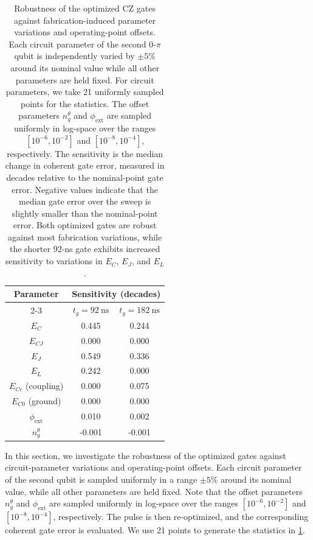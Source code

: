 \begin{table}[htbp]
\centering
\setlength{\tabcolsep}{11pt}
\renewcommand{\arraystretch}{1.1}
\small
\begin{tabular}{ccc}
\toprule
\multirow{2}{*}{Parameter}
& \multicolumn{2}{c}{Sensitivity (decades)} \\
\cmidrule(lr){2-3}
& $t_g = 92~\mathrm{ns}$ & $t_g = 182~\mathrm{ns}$ \\ \midrule
$E_{C}$                 & 0.445  & 0.244  \\
$E_{CJ}$                & 0.000  & 0.000 \\
$E_{J}$                 & 0.549  & 0.336  \\
$E_{L}$                 & 0.242  & 0.000  \\
$E_{Cc}$ (coupling)      & 0.000  & 0.075  \\
$E_{C0}$ (ground)        & 0.000  & 0.000  \\
$\phi_{\mathrm{ext}}$  & 0.010  & 0.002  \\
$n_{g}^\theta$                & -0.001 & -0.001 \\
\bottomrule
\end{tabular}
\caption[Sensitivity of the CZ gate to parameter variations.]{
Robustness of the optimized CZ gates against fabrication-induced parameter variations and operating-point offsets.
Each circuit parameter of the second 0-$\pi$ qubit is independently varied by $\pm5\%$ around its nominal value while all other parameters are held fixed.
For circuit parameters, we take 21 uniformly sampled points for the statistics.
The offset parameters $n_{g}^{\theta}$ and $\phi_{\mathrm{ext}}$ are sampled uniformly in log-space over
the ranges $[10^{-6},10^{-2}]$ and $[10^{-8},10^{-4}]$, respectively.
The sensitivity is the median change in coherent gate error, measured in decades relative to the nominal-point gate error.
Negative values indicate that the median gate error over the sweep is slightly smaller than the nominal-point error.
Both optimized gates are robust against most fabrication variations, while the shorter 92-ns gate exhibits increased sensitivity to variations in $E_{C}$, $E_{J}$, and $E_{L}$.
}
\label{zp:tab:cz_sensitivity}
\end{table}

In this section, we investigate the robustness of the optimized gates against circuit-parameter variations and operating-point offsets.
Each circuit parameter of the second \zps qubit is sampled uniformly in a range $\pm5\%$ around its nominal value, while all other parameters are held fixed.
Note that the offset parameters $n_{g}^{\theta}$ and $\phi_{\mathrm{ext}}$ are sampled uniformly in log-space over the ranges $[10^{-6},10^{-2}]$ and $[10^{-8},10^{-4}]$, respectively.
The pulse is then re-optimized, and the corresponding coherent gate error is evaluated.
We use 21 points to generate the statistics in \cref{zp:tab:cz_sensitivity}.

